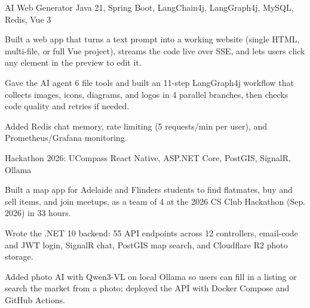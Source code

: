 \resumeProject
  {AI Web Generator}
  {Java 21, Spring Boot, LangChain4j, LangGraph4j, MySQL, Redis, Vue 3}
  { \textbar\ }
  {
    \item Built a web app that turns a text prompt into a working website (single HTML, multi-file, or full Vue project), streams the code live over SSE, and lets users click any element in the preview to edit it.
    \item Gave the AI agent 6 file tools and built an 11-step LangGraph4j workflow that collects images, icons, diagrams, and logos in 4 parallel branches, then checks code quality and retries if needed.
    \item Added Redis chat memory, rate limiting (5 requests/min per user), and Prometheus/Grafana monitoring.
  }

\resumeProject
  {Hackathon 2026: UCompass}
  {React Native, ASP.NET Core, PostGIS, SignalR, Ollama}
  { \textbar\ }
  {
    \item Built a map app for Adelaide and Flinders students to find flatmates, buy and sell items, and join meetups, as a team of 4 at the 2026 CS Club Hackathon (Sep. 2026) in 33 hours.
    \item Wrote the .NET 10 backend: 55 API endpoints across 12 controllers, email-code and JWT login, SignalR chat, PostGIS map search, and Cloudflare R2 photo storage.
    \item Added photo AI with Qwen3-VL on local Ollama so users can fill in a listing or search the market from a photo; deployed the API with Docker Compose and GitHub Actions.
  }
